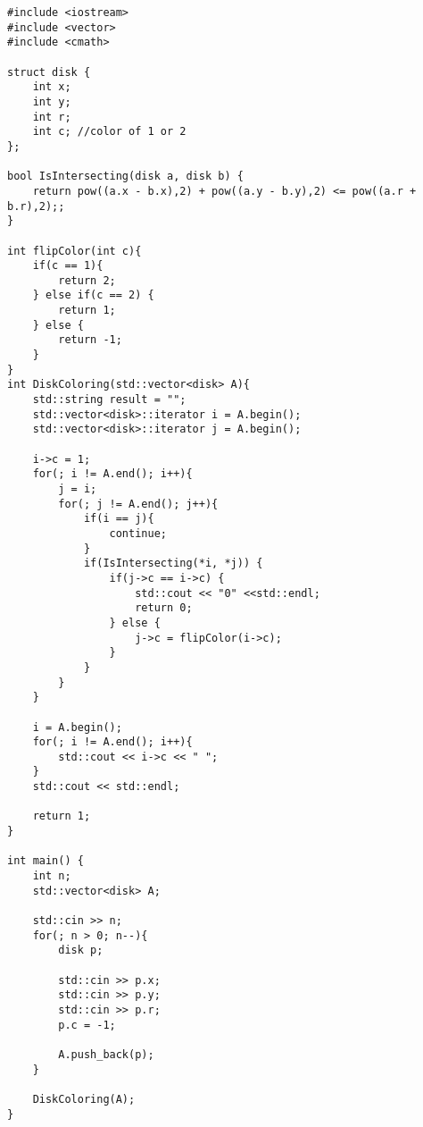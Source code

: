 \documentclass[12pt]{article}
\begin{document}
\begin{verbatim}
#include <iostream>
#include <vector>
#include <cmath>

struct disk {
    int x;
    int y;
    int r;
    int c; //color of 1 or 2
};

bool IsIntersecting(disk a, disk b) {
    return pow((a.x - b.x),2) + pow((a.y - b.y),2) <= pow((a.r + b.r),2);;
}

int flipColor(int c){
    if(c == 1){
        return 2;
    } else if(c == 2) {
        return 1;
    } else {
        return -1;
    }
}
int DiskColoring(std::vector<disk> A){
    std::string result = "";
    std::vector<disk>::iterator i = A.begin();
    std::vector<disk>::iterator j = A.begin();

    i->c = 1;
    for(; i != A.end(); i++){
        j = i;
        for(; j != A.end(); j++){
            if(i == j){
                continue;
            }
            if(IsIntersecting(*i, *j)) {
                if(j->c == i->c) {
                    std::cout << "0" <<std::endl;
                    return 0;
                } else {
                    j->c = flipColor(i->c);
                }
            }
        }
    }

    i = A.begin();
    for(; i != A.end(); i++){
        std::cout << i->c << " ";
    }
    std::cout << std::endl;

    return 1;
}

int main() {
    int n;
    std::vector<disk> A;

    std::cin >> n;
    for(; n > 0; n--){
        disk p;

        std::cin >> p.x;
        std::cin >> p.y;
        std::cin >> p.r;
        p.c = -1;

        A.push_back(p);
    }

    DiskColoring(A);
}
\end{verbatim}
\end{document}
